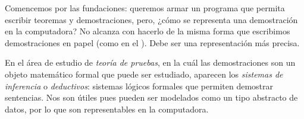 \newcommand{\reprueba}{X}
\newcommand{\recursa}{R}
\newcommand{\falta}{F}

\newcommand{\predReprueba}{\textrm{reprueba}}
\newcommand{\predRecursa}{\textrm{recursa}}
\newcommand{\predFalta}{\textrm{falta}}
\newcommand{\funFinal}{\textrm{final}}

\newcommand{\vAlu}{a}
\newcommand{\vMat}{m}
\newcommand{\vEx}{e}

\newcommand{\proofSpacing}{\vspace*{0.2cm}}


Comencemos por las fundaciones: queremos armar un programa que permita escribir
teoremas y demostraciones, pero, ¿cómo se representa una demostración en la
computadora? No alcanza con hacerlo de la misma forma que escribimos demostraciones en papel (como en el ). Debe ser una representación más precisa.

En el área de estudio de \textit{teoría de pruebas}, en la cuál las
demostraciones son un objeto matemático formal que puede ser estudiado, aparecen
los \textit{sistemas de inferencia} o \textit{deductivos}: sistemas lógicos formales que
permiten demostrar sentencias. Nos son útiles pues pueden ser modelados como un
tipo abstracto de datos, por lo que son representables en la computadora.

